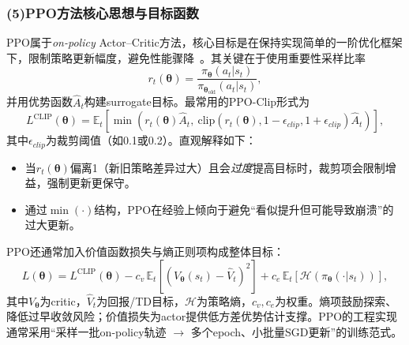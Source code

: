   \subsubsection*{(5)PPO方法核心思想与目标函数}
    PPO属于\emph{on-policy} Actor--Critic方法，核心目标是在保持实现简单的一阶优化框架下，限制策略更新幅度，避免性能骤降~\cite{PPO_2017}。其关键在于使用重要性采样比率
    \begin{equation}
    r_t(\bm{\theta})=\frac{\pi_\bm{\theta}(a_t|s_t)}{\pi_{\bm{\theta}_{\text{old}}}(a_t|s_t)},
    \end{equation}
    并用优势函数$\hat{A}_t$构建surrogate目标。最常用的PPO-Clip形式为
    \begin{equation}
    L^{\text{CLIP}}(\bm{\theta})=\mathbb{E}_t\left[\min\left(r_t(\bm{\theta})\hat{A}_t,\ \text{clip}(r_t(\bm{\theta}),1-\epsilon_{clip},1+\epsilon_{clip})\hat{A}_t\right)\right],
    \label{eq:ppo_clip}
    \end{equation}
    其中$\epsilon_{clip}$为裁剪阈值（如0.1或0.2）。直观解释如下：
    \begin{itemize}
    \item 当$r_t(\bm{\theta})$偏离1（新旧策略差异过大）且会\emph{过度}提高目标时，裁剪项会限制增益，强制更新更保守。
    \item 通过$\min(\cdot)$结构，PPO在经验上倾向于避免“看似提升但可能导致崩溃”的过大更新。
    \end{itemize}

    PPO还通常加入价值函数损失与熵正则项构成整体目标：
    \begin{equation}
    L(\bm{\theta})=L^{\text{CLIP}}(\bm{\theta})-c_v\,\mathbb{E}_t\left[(V_\bm{\theta}(s_t)-\hat{V}_t)^2\right]+c_e\,\mathbb{E}_t\left[\mathcal{H}(\pi_\bm{\theta}(\cdot|s_t))\right],
    \label{eq:ppo_total}
    \end{equation}
    其中$V_\bm{\theta}$为critic，$\hat{V}_t$为回报/TD目标，$\mathcal{H}$为策略熵，$c_v,c_e$为权重。熵项鼓励探索、降低过早收敛风险；价值损失为actor提供低方差优势估计支撑。PPO的工程实现通常采用“采样一批on-policy轨迹 $\rightarrow$ 多个epoch、小批量SGD更新”的训练范式。


